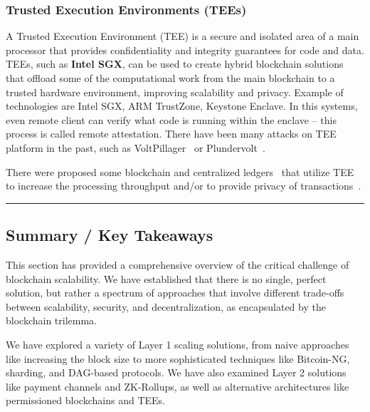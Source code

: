 \subsubsection{Trusted Execution Environments
(TEEs)}\label{trusted-execution-environments-tees}

A Trusted Execution Environment (TEE) is a secure and isolated area of a
main processor that provides confidentiality and integrity guarantees
for code and data. TEEs, such as \textbf{Intel SGX}, can be used to
create hybrid blockchain solutions that offload some of the
computational work from the main blockchain to a trusted hardware
environment, improving scalability and privacy.
Example of technologies are Intel SGX, ARM TrustZone, Keystone Enclave.
In this systems, even remote client can verify what code is running within the enclave -- this process is called remote attestation.
There have been many attacks on TEE platform in the past, such as VoltPillager~\cite{chen2021voltpillager} or Plundervolt~\cite{murdock2020plundervolt}.

There were proposed some blockchain and centralized ledgers~\cite{homoliak2020aquareum} that utilize TEE to increase the processing throughput and/or to provide privacy of transactions~\cite{cheng2019ekiden}.  


\begin{center}\rule{0.5\linewidth}{0.5pt}\end{center}

\subsection{Summary / Key Takeaways}\label{summary-key-takeaways}

This section has provided a comprehensive overview of the critical
challenge of blockchain scalability. We have established that there is
no single, perfect solution, but rather a spectrum of approaches that
involve different trade-offs between scalability, security, and
decentralization, as encapsulated by the blockchain trilemma.

We have explored a variety of Layer 1 scaling solutions, from naive
approaches like increasing the block size to more sophisticated
techniques like Bitcoin-NG, sharding, and DAG-based protocols. We have
also examined Layer 2 solutions like payment channels and ZK-Rollups, as
well as alternative architectures like permissioned blockchains and
TEEs.

